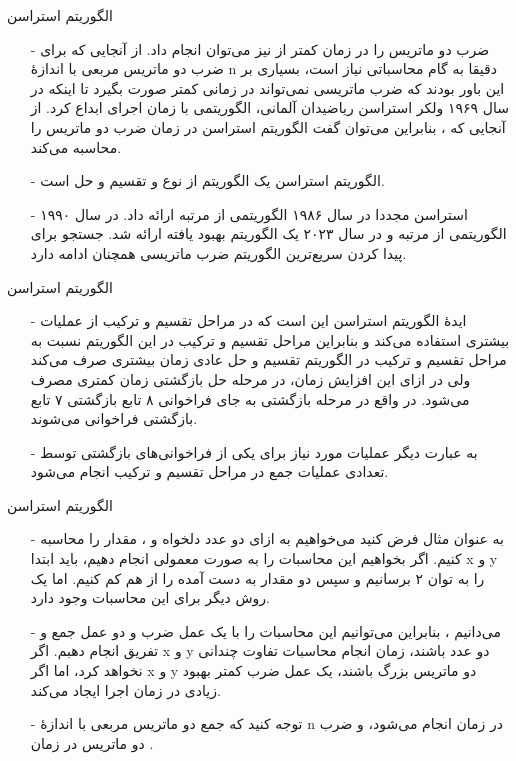 
\begin{frame}{‌الگوریتم استراسن}
\begin{itemize}\itemr
\item[-]
ضرب دو ماتریس
را در زمان کمتر از
نیز می‌توان انجام داد. از آنجایی که برای ضرب دو ماتریس مربعی با اندازهٔ n دقیقا به
گام محاسباتی نیاز است،‌ بسیاری بر این باور بودند که ضرب ماتریسی نمی‌تواند در زمانی کمتر صورت بگیرد تا اینکه در سال ۱۹۶۹ ولکر استراسن
 ریاضیدان آلمانی، الگوریتمی با زمان اجرای
ابداع کرد. از آنجایی که
، بنابراین می‌توان گفت الگوریتم استراسن در زمان
ضرب دو ماتریس را محاسبه می‌کند.
\item[-]
الگوریتم استراسن یک الگوریتم از نوع و تقسیم و حل است.
\item[-]
استراسن مجددا در سال ۱۹۸۶ الگوریتمی از مرتبه
ارائه داد.
در سال ۱۹۹۰ الگوریتمی از مرتبه
و در سال ۲۰۲۳ یک الگوریتم بهبود یافته ارائه شد.
 جستجو برای پیدا کردن سریع‌ترین الگوریتم ضرب ماتریسی همچنان ادامه دارد.
\end{itemize}
\end{frame}


\begin{frame}{‌الگوریتم استراسن}
\begin{itemize}\itemr
\item[-]
ایدهٔ الگوریتم استراسن این است که در مراحل تقسیم و ترکیب از عملیات بیشتری استفاده می‌کند و بنابراین مراحل تقسیم و ترکیب در این الگوریتم نسبت به مراحل تقسیم و ترکیب در الگوریتم تقسیم و حل عادی زمان بیشتری صرف می‌کند ولی در ازای این افزایش زمان، در مرحله حل بازگشتی زمان کمتری مصرف می‌شود. در واقع در مرحله بازگشتی به جای فراخوانی ۸ تابع بازگشتی ۷ تابع بازگشتی فراخوانی می‌شوند.
\item[-]
به عبارت دیگر عملیات مورد نیاز برای یکی از فراخوانی‌های بازگشتی توسط تعدادی عملیات جمع در مراحل تقسیم و ترکیب انجام می‌شود.
\end{itemize}
\end{frame}


\begin{frame}{‌الگوریتم استراسن}
\begin{itemize}\itemr
\item[-]
به عنوان مثال فرض کنید می‌خواهیم به ازای دو عدد دلخواه 
 و 
  ، مقدار
را محاسبه کنیم. اگر بخواهیم این محاسبات را به صورت معمولی انجام دهیم، باید ابتدا x و y را به توان ۲ برسانیم و سپس دو مقدار به دست آمده را از هم کم کنیم. اما یک روش دیگر برای این محاسبات وجود دارد.
\item[-]
می‌دانیم
، بنابراین می‌توانیم این محاسبات را با یک عمل ضرب و دو عمل جمع و تفریق انجام دهبم. اگر x و y دو عدد باشند،‌ زمان انجام محاسبات تفاوت چندانی نخواهد کرد، اما اگر x و y دو ماتریس بزرگ باشند، یک عمل ضرب کمتر بهبود زیادی در زمان اجرا ایجاد می‌کند.
\item[-]
توجه کنید که جمع دو ماتریس مربعی با اندازهٔ n در زمان 
انجام می‌شود، و ضرب دو ماتریس در زمان
 .
\end{itemize}
\end{frame}


